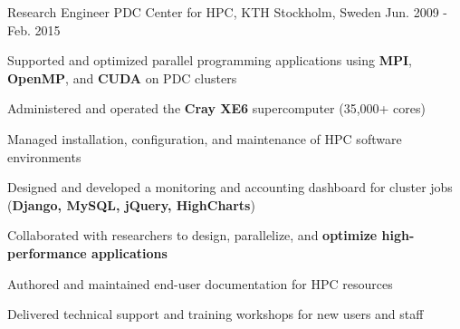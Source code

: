 \begin{cventries}

\cventry
{Research Engineer} %
{PDC Center for HPC, KTH} %
{Stockholm, Sweden} %
{Jun. 2009 - Feb. 2015} %
{ %
\begin{cvitems}
\item Supported and optimized parallel programming applications using \textbf{MPI}, \textbf{OpenMP}, and \textbf{CUDA} on PDC clusters  
\item Administered and operated the \textbf{Cray XE6} supercomputer (35,000+ cores)
\item Managed installation, configuration, and maintenance of HPC software environments
\item Designed and developed a monitoring and accounting dashboard for cluster jobs (\textbf{Django, MySQL, jQuery, HighCharts})
\item Collaborated with researchers to design, parallelize, and \textbf{optimize high-performance applications}
\item Authored and maintained end-user documentation for HPC resources
\item Delivered technical support and training workshops for new users and staff
\end{cvitems}
}


\end{cventries}
